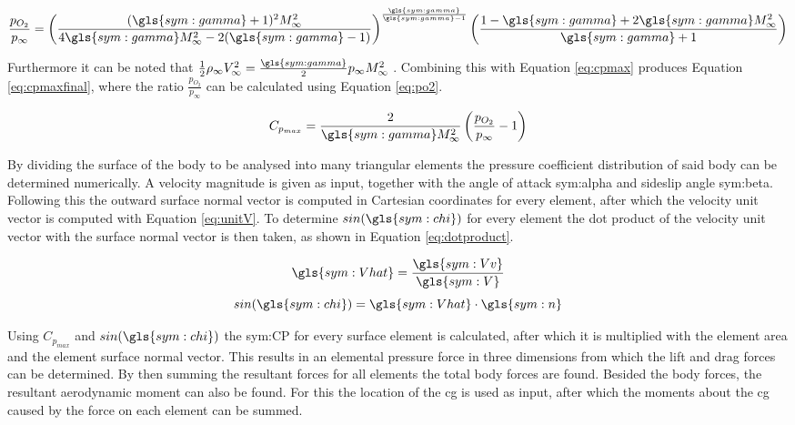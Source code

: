 \begin{equation}
\frac{p_{O_{2}}}{p_{\infty}}=\left(\frac{(\gls{sym:gamma}+1)^{2}M_{\infty}^{2}}{4\gls{sym:gamma} M_{\infty}^{2}-2(\gls{sym:gamma}-1)}\right)^{\frac{\gls{sym:gamma}}{\gls{sym:gamma}-1}}\left(\frac{1-\gls{sym:gamma}+2\gls{sym:gamma} M_{\infty}^{2}}{\gls{sym:gamma}+1}\right)
\label{eq:po2}
\end{equation}

Furthermore it can be noted that $\frac{1}{2}\rho_{\infty}V_{\infty}^{2}=\frac{\gls{sym:gamma}}{2}p_{\infty}M_{\infty}^{2}$ \cite{AndersonJr.2007}. Combining this with Equation \ref{eq:cpmax} produces Equation \ref{eq:cpmaxfinal}, where the ratio $\frac{p_{O_{2}}}{p_{\infty}}$ can be calculated using Equation \ref{eq:po2}.

\begin{equation}
C_{p_{max}}=\frac{2}{\gls{sym:gamma} M_{\infty}^{2}}\left(\frac{p_{O_{2}}}{p_{\infty}}-1\right)
\label{eq:cpmaxfinal}
\end{equation}

By dividing the surface of the body to be analysed into many triangular elements the pressure coefficient distribution of said body can be determined numerically. A velocity magnitude is given as input, together with the angle of attack \gls{sym:alpha} and sideslip angle \gls{sym:beta}. Following this the outward surface normal vector is computed in Cartesian coordinates for every element, after which the velocity unit vector is computed with Equation \ref{eq:unitV}. To determine $sin(\gls{sym:chi})$ for every element the dot product of the velocity unit vector with the surface normal vector is then taken, as shown in Equation \ref{eq:dotproduct}.
\begin{multicols}{2}
\begin{equation}
\gls{sym:Vhat}=\frac{\gls{sym:Vv}}{\gls{sym:V}}
\label{eq:unitV}
\end{equation} \break
\begin{equation}
sin(\gls{sym:chi})=\gls{sym:Vhat} \cdot \gls{sym:n}
\label{eq:dotproduct}
\end{equation}
\end{multicols}
Using $C_{p_{max}}$ and $sin(\gls{sym:chi})$ the \gls{sym:CP} for every surface element is calculated, after which it is multiplied with the element area and the element surface normal vector. This results in an elemental pressure force in three dimensions from which the lift and drag forces can be determined. By then summing the resultant forces for all elements the total body forces are found. Besided the body forces, the resultant aerodynamic moment can also be found. For this the location of the \acrfull{cg} is used as input, after which the moments about the \gls{cg} caused by the force on each element can be summed. 

